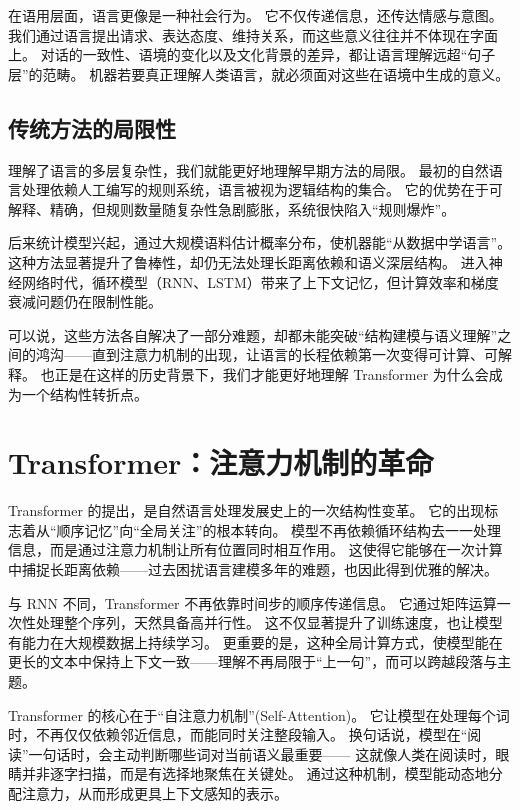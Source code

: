 在语用层面，语言更像是一种社会行为。  
它不仅传递信息，还传达情感与意图。  
我们通过语言提出请求、表达态度、维持关系，而这些意义往往并不体现在字面上。  
对话的一致性、语境的变化以及文化背景的差异，都让语言理解远超“句子层”的范畴。  
机器若要真正理解人类语言，就必须面对这些在语境中生成的意义。  

\subsection{传统方法的局限性}

理解了语言的多层复杂性，我们就能更好地理解早期方法的局限。  
最初的自然语言处理依赖人工编写的规则系统，语言被视为逻辑结构的集合。  
它的优势在于可解释、精确，但规则数量随复杂性急剧膨胀，系统很快陷入“规则爆炸”。  

后来统计模型兴起，通过大规模语料估计概率分布，使机器能“从数据中学语言”。  
这种方法显著提升了鲁棒性，却仍无法处理长距离依赖和语义深层结构。  
进入神经网络时代，循环模型（RNN、LSTM）带来了上下文记忆，但计算效率和梯度衰减问题仍在限制性能。  

可以说，这些方法各自解决了一部分难题，却都未能突破“结构建模与语义理解”之间的鸿沟——直到注意力机制的出现，让语言的长程依赖第一次变得可计算、可解释。  也正是在这样的历史背景下，我们才能更好地理解 Transformer 为什么会成为一个结构性转折点。

\section{Transformer：注意力机制的革命}

Transformer 的提出，是自然语言处理发展史上的一次结构性变革。  
它的出现标志着从“顺序记忆”向“全局关注”的根本转向。  
模型不再依赖循环结构去一一处理信息，而是通过注意力机制让所有位置同时相互作用。  
这使得它能够在一次计算中捕捉长距离依赖——过去困扰语言建模多年的难题，也因此得到优雅的解决。  

与 RNN 不同，Transformer 不再依靠时间步的顺序传递信息。  
它通过矩阵运算一次性处理整个序列，天然具备高并行性。  
这不仅显著提升了训练速度，也让模型有能力在大规模数据上持续学习。  
更重要的是，这种全局计算方式，使模型能在更长的文本中保持上下文一致——理解不再局限于“上一句”，而可以跨越段落与主题。  

Transformer 的核心在于“自注意力机制”(Self-Attention)。  
它让模型在处理每个词时，不再仅仅依赖邻近信息，而能同时关注整段输入。  
换句话说，模型在“阅读”一句话时，会主动判断哪些词对当前语义最重要——  
这就像人类在阅读时，眼睛并非逐字扫描，而是有选择地聚焦在关键处。  
通过这种机制，模型能动态地分配注意力，从而形成更具上下文感知的表示。  

